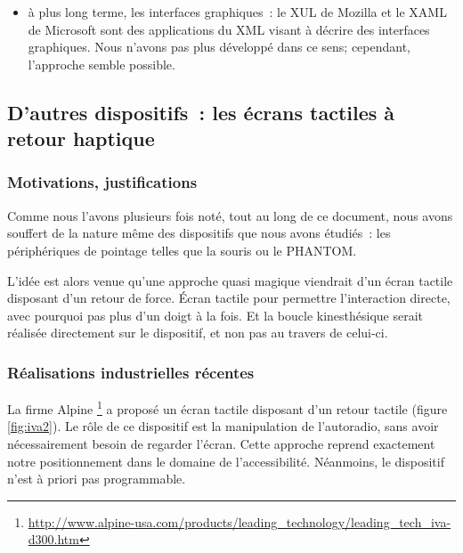 \documentclass[
]{book}
\providecommand{\tightlist}{%
  \setlength{\itemsep}{0pt}\setlength{\parskip}{0pt}}
\begin{document}
\begin{itemize}
\tightlist
\item
  à plus long terme, les interfaces graphiques~: le
  XUL de Mozilla et le XAML de Microsoft sont des applications du XML visant
  à décrire des interfaces graphiques. Nous n'avons pas plus développé dans
  ce sens; cependant, l'approche semble possible.
\end{itemize}

\hypertarget{dautres-dispositifs-les-uxe9crans-tactiles-uxe0-retour-haptique}{%
\subsection{D'autres dispositifs~: les écrans tactiles à retour haptique}\label{dautres-dispositifs-les-uxe9crans-tactiles-uxe0-retour-haptique}}

\hypertarget{motivations-justifications}{%
\subsubsection{Motivations, justifications}\label{motivations-justifications}}

Comme nous l'avons plusieurs fois noté, tout au long de ce document, nous
avons souffert de la nature même des dispositifs que nous avons étudiés~: les
périphériques de pointage telles que la souris ou le PHANTOM.

L'idée est alors venue qu'une approche quasi magique viendrait d'un écran
tactile disposant d'un retour de force. Écran tactile pour permettre
l'interaction directe, avec pourquoi pas plus d'un doigt à la fois. Et la
boucle kinesthésique serait réalisée directement sur le dispositif, et non
pas au travers de celui-ci.

\hypertarget{ruxe9alisations-industrielles-ruxe9centes}{%
\subsubsection{Réalisations industrielles récentes}\label{ruxe9alisations-industrielles-ruxe9centes}}

La firme Alpine \footnote{\url{http://www.alpine-usa.com/products/leading_technology/leading_tech_iva-d300.htm}}
a proposé un écran tactile
disposant d'un retour tactile (figure \ref{fig:iva2}). Le
rôle de ce dispositif est la manipulation de l'autoradio, sans avoir
nécessairement besoin de regarder l'écran. Cette approche reprend exactement
notre positionnement dans le domaine de l'accessibilité. Néanmoins, le
dispositif n'est à priori pas programmable.
\end{document}
